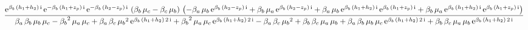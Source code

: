 \documentclass[9pt]{article}
\begin{document}
  \begin{equation}
    \centering
    \frac{\mathrm{e}^{\mathrm{\beta}_{b}\, \left(h_{1} + h_{2}\right)\, \mathrm{i}}\, \mathrm{e}^{- \mathrm{\beta}_{b}\, \left(h_{1} + z_{p}\right)\, \mathrm{i}}\, \mathrm{e}^{- \mathrm{\beta}_{b}\, \left(h_{2} - z_{p}\right)\, \mathrm{i}}\, \left(\mathrm{\beta}_{b}\, \mathrm{\mu}_{c} - \mathrm{\beta}_{c}\, \mathrm{\mu}_{b}\right)\, \left( - \mathrm{\beta}_{a}\, \mathrm{\mu}_{b}\, \mathrm{e}^{\mathrm{\beta}_{b}\, \left(h_{2} - z_{p}\right)\, \mathrm{i}} + \mathrm{\beta}_{b}\, \mathrm{\mu}_{a}\, \mathrm{e}^{\mathrm{\beta}_{b}\, \left(h_{2} - z_{p}\right)\, \mathrm{i}} + \mathrm{\beta}_{a}\, \mathrm{\mu}_{b}\, \mathrm{e}^{\mathrm{\beta}_{b}\, \left(h_{1} + h_{2}\right)\, \mathrm{i}}\, \mathrm{e}^{\mathrm{\beta}_{b}\, \left(h_{1} + z_{p}\right)\, \mathrm{i}} + \mathrm{\beta}_{b}\, \mathrm{\mu}_{a}\, \mathrm{e}^{\mathrm{\beta}_{b}\, \left(h_{1} + h_{2}\right)\, \mathrm{i}}\, \mathrm{e}^{\mathrm{\beta}_{b}\, \left(h_{1} + z_{p}\right)\, \mathrm{i}}\right)}{\mathrm{\beta}_{a}\, \mathrm{\beta}_{b}\, \mathrm{\mu}_{b}\, \mathrm{\mu}_{c} - {\mathrm{\beta}_{b}}^2\, \mathrm{\mu}_{a}\, \mathrm{\mu}_{c} + \mathrm{\beta}_{a}\, \mathrm{\beta}_{c}\, {\mathrm{\mu}_{b}}^2\, \mathrm{e}^{\mathrm{\beta}_{b}\, \left(h_{1} + h_{2}\right)\, 2\, \mathrm{i}} + {\mathrm{\beta}_{b}}^2\, \mathrm{\mu}_{a}\, \mathrm{\mu}_{c}\, \mathrm{e}^{\mathrm{\beta}_{b}\, \left(h_{1} + h_{2}\right)\, 2\, \mathrm{i}} - \mathrm{\beta}_{a}\, \mathrm{\beta}_{c}\, {\mathrm{\mu}_{b}}^2 + \mathrm{\beta}_{b}\, \mathrm{\beta}_{c}\, \mathrm{\mu}_{a}\, \mathrm{\mu}_{b} + \mathrm{\beta}_{a}\, \mathrm{\beta}_{b}\, \mathrm{\mu}_{b}\, \mathrm{\mu}_{c}\, \mathrm{e}^{\mathrm{\beta}_{b}\, \left(h_{1} + h_{2}\right)\, 2\, \mathrm{i}} + \mathrm{\beta}_{b}\, \mathrm{\beta}_{c}\, \mathrm{\mu}_{a}\, \mathrm{\mu}_{b}\, \mathrm{e}^{\mathrm{\beta}_{b}\, \left(h_{1} + h_{2}\right)\, 2\, \mathrm{i}}}
    \label{eq:X3}
  \end{equation}
\end{document}
